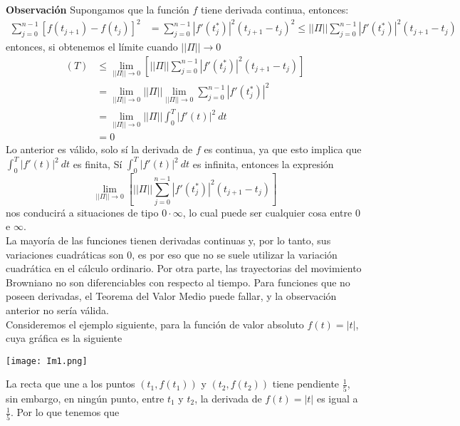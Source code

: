\documentclass[11pt,notitlepage]{article}
\begin{document}
\textbf{Observación} Supongamos que la función \(f\) tiene derivada continua, entonces:
\begin{align*}
    \sum_{j=0}^{n-1}\left[f(t_{j+1})-f(t_j)\right]^2 &= \sum_{j=0}^{n-1} \left|f'(t_j^*)\right|^2(t_{j+1}-t_j)^2 \leq ||\Pi|| \sum_{j=0}^{n-1} \left|f'(t_j^*)\right|^2(t_{j+1}-t_j)
\end{align*}
entonces, si obtenemos el límite cuando \(||\Pi|| \to 0\)
\begin{align*}
    [f,f](T) &\leq \lim_{||\Pi|| \to 0} \left[||\Pi|| \sum_{j=0}^{n-1} \left|f'(t_j^*)\right|^2(t_{j+1}-t_j)\right]\\
    &= \lim_{||\Pi|| \to 0} ||\Pi||  \lim_{||\Pi|| \to 0} \sum_{j=0}^{n-1} \left|f'(t_j^*)\right|^2\\
    &= \lim_{||\Pi|| \to 0} ||\Pi|| \int_0^T |f'(t)|^2 ~ dt\\
    &=0
\end{align*}
Lo anterior es válido, solo sí la derivada de \(f\) es continua, ya que esto implica que \(\int_0^T |f'(t)|^2 ~dt\) es finita, Sí \(\int_0^T |f'(t)|^2 ~dt\) es infinita, entonces la expresión
\[\lim_{||\Pi|| \to 0} \left[||\Pi|| \sum_{j=0}^{n-1} \left|f'(t_j^*)\right|^2(t_{j+1}-t_j)\right]\]
nos conducirá a situaciones de tipo \(0 \cdot \infty\), lo cual puede ser cualquier cosa entre \(0\) e \(\infty\).\\
La mayoría de las funciones tienen derivadas continuas y, por lo tanto, sus variaciones cuadráticas son \(0\), es por eso que no se suele utilizar la variación cuadrática en el cálculo ordinario. Por otra parte, las trayectorias del movimiento Browniano no son diferenciables con respecto al tiempo. Para funciones que no poseen derivadas, el Teorema del Valor Medio puede fallar, y la observación anterior no sería válida. \\

Consideremos el ejemplo siguiente, para la función de valor absoluto \(f(t)=|t|\), cuya gráfica es la siguiente
\begin{center}
  \texttt{[image: Im1.png]}  
\end{center}
La recta que une a los puntos \(\left(t_1, f(t_1)\right)\) y \(\left(t_2, f(t_2)\right)\) tiene pendiente \(\frac{1}{5}\), sin embargo, en ningún punto, entre \(t_1\) y \(t_2\), la derivada de \(f(t)=|t|\) es igual a \(\frac{1}{5}\). Por lo que tenemos que
\end{document}
